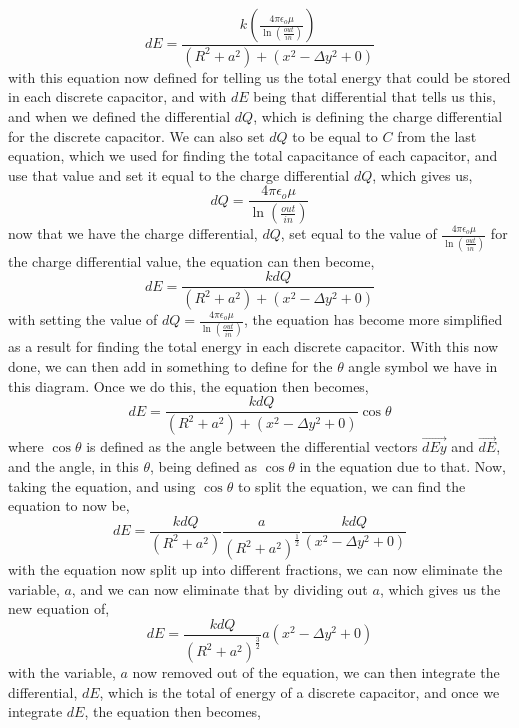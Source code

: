 \documentclass[]{article}
\begin{document}
\begin{equation}
dE = \frac{k(\frac{4\pi\epsilon_o\mu}{\ln(\frac{out}{in})})}{(R^2+a^2) + (x^2 - \Delta{y}^2+0)}
\end{equation}
with this equation now defined for telling us the total energy that could be stored in each discrete capacitor, and with $dE$ being that differential that tells us this, and when we defined the differential $dQ$, which is defining the charge differential for the discrete capacitor. We can also set $dQ$ to be equal to $C$ from the last equation, which we used for finding the total capacitance of each capacitor, and use that value and set it equal to the charge differential $dQ$, which gives us, 
\linebreak
\[dQ = \frac{4\pi\epsilon_o\mu}{\ln(\frac{out}{in})}\]
now that we have the charge differential, $dQ$, set equal to the value of $\frac{4\pi\epsilon_o\mu}{\ln(\frac{out}{in})}$ for the charge differential value, the equation can then become,
\begin{equation}
dE = \frac{kdQ}{(R^2 + a^2) + (x^2 - \Delta{y}^2+0)} 
\end{equation}
with setting the value of $dQ = \frac{4\pi\epsilon_o\mu}{\ln(\frac{out}{in})}$, the equation has become more simplified as a result for finding the total energy in each discrete capacitor. With this now done, we can then add in something to define for the $\theta$ angle symbol we have in this diagram. Once we do this, the equation then becomes,
\begin{equation}
dE = \frac{kdQ}{(R^2+a^2) + (x^2 - \Delta{y}^2 + 0)} \cos\theta
\end{equation}
where $\cos\theta$ is defined as the angle between the differential vectors $\vec{dEy}$ and $\vec{dE}$, and the angle, in this $\theta$, being defined as $\cos\theta$ in the equation due to that. Now, taking the equation, and using $\cos\theta$ to split the equation, we can find the equation to now be, 
\begin{equation}
dE = \frac{kdQ}{(R^2 + a^2)} \frac{a}{(R^2+a^2)^\frac{1}{2}}\frac{kdQ}{(x^2-\Delta{y}^2+0)}
\end{equation}
with the equation now split up into different fractions, we can now eliminate the variable, $a$, and we can now eliminate that by dividing out $a$, which gives us the new equation of,
\begin{equation}
dE = \frac{kdQ}{(R^2+a^2)^\frac{3}{2}} a(x^2-\Delta{y}^2+0)
\end{equation}
with the variable, $a$ now removed out of the equation, we can then integrate the differential, $dE$, which is the total of energy of a discrete capacitor, and once we integrate $dE$, the equation then becomes, 
\end{document}
